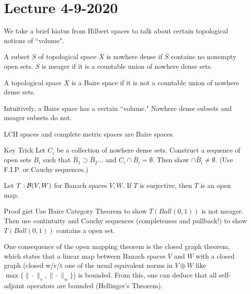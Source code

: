\section{Lecture 4-9-2020}
We take a brief hiatus from Hilbert spaces to talk about certain topological notions of ``volume".
\begin{dfn}
    A subset $S$ of topological space $X$ is nowhere dense if $\bar{S}$ contains no nonempty open sets. $S$ is meager if it is a countable union of nowhere dense sets.
\end{dfn}
\begin{dfn}
    A topological space $X$ is a Baire space if it is not a countable union of nowhere dense sets.
\end{dfn}
\begin{remark}
    Intuitively, a Baire space has a certain ``volume." Nowhere dense subsets and meager subsets do not.
\end{remark}
\begin{thm}
    LCH spaces and complete metric spaces are Baire spaces.
\end{thm}
\begin{details}{Key Trick}
    Let $C_i$ be a collection of nowhere dense sets. Construct a sequence of open sets $B_i$ such that $\bar{B}_1 \supset \bar{B}_2 \dots$ and $C_i \cap \bar{B}_i = \emptyset$. Then show $\cap \bar{B}_i \neq \emptyset$. (Use F.I.P. or Cauchy sequences.)
\end{details}
\begin{thm}
    Let $T: {\mathcal B}(V,W)$ for Banach spaces $V, W$. If $T$ is surjective, then $T$ is an open map.
\end{thm}
\begin{details}{Proof gist}
    Use Baire Category Theorem to show $T(Ball(0,1))$ is not meager. Then use contintuity and Cauchy sequences (completeness and pullback!) to show $T(Ball(0,1))$ contains a open set.
\end{details}
One consequence of the open mapping theorem is the closed graph theorem, which states that a linear map between Banach spaces $V$ and $W$ with a closed graph (closed w/r/t one of the usual equivalent norms in $V \oplus W$ like $\max\{\|\cdot\|_v, \|\cdot\|_w\}$) is bounded. From this, one can deduce that all self-adjoint operators are bounded (Hellinger's Theorem).

